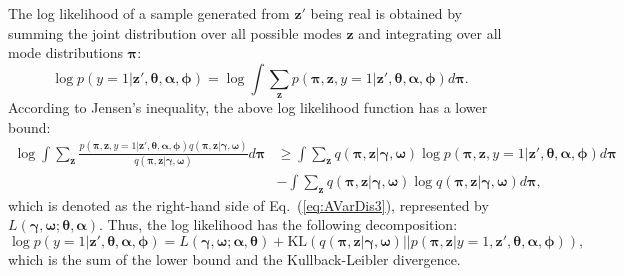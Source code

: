 \documentclass{article}
\begin{document}
The log likelihood of a sample generated from $\mathbf{z}'$ being real is obtained by summing the joint distribution over all possible modes $\mathbf{z}$ and integrating over all mode distributions $\bm{\pi}$:
\begin{equation}
\label{eq:AVarDis2}
\log p\left( y=1 | \mathbf{z}',\bm{\theta},\bm{\alpha}, \bm{\phi} \right)
=
\log
\int
\sum_{\mathbf{z}}
p\left( \bm{\pi},\mathbf{z},y=1 | \mathbf{z}',\bm{\theta},\bm{\alpha},\bm{\phi} \right)
d\bm{\pi}.
\end{equation}
\noindent According to Jensen's inequality, the above log likelihood function has a lower bound:
\begin{align}
\label{eq:AVarDis3}
\log
\int
\sum_{\mathbf{z}}
\frac{p\left( \bm{\pi},\mathbf{z},y=1 | \mathbf{z}',\bm{\theta},\bm{\alpha},\bm{\phi} \right)
q\left( \bm{\pi},\mathbf{z} | \bm{\gamma},\bm{\omega} \right)}
{q\left( \bm{\pi}, \mathbf{z} | \bm{\gamma},\bm{\omega} \right)}
d\bm{\pi}
&\geq  \nonumber
\int
\sum_{\mathbf{z}}
q\left( \bm{\pi}, \mathbf{z}|\bm{\gamma},\bm{\omega} \right)
\log p\left( \bm{\pi},\mathbf{z},y=1 | \mathbf{z}',\bm{\theta},\bm{\alpha},\bm{\phi} \right)
d\bm{\pi}  \\
&-\int
\sum_{\mathbf{z}}
q\left( \bm{\pi},\mathbf{z} | \bm{\gamma},\bm{\omega} \right)
\log q\left( \bm{\pi},\mathbf{z} | \bm{\gamma},\bm{\omega} \right)
d\bm{\pi},
\end{align}
which is denoted as the right-hand side of Eq.~(\ref{eq:AVarDis3}), represented by $L\left(\bm{\gamma},\bm{\omega};\bm{\theta},\bm{\alpha}\right)$.
Thus, the log likelihood has the following decomposition:
\begin{equation}
\label{eq:AVarDis4}
\log p\left(y=1|\mathbf{z}',\bm{\theta},\bm{\alpha}, \bm{\phi}\right)
=
L\left( \bm{\gamma},\bm{\omega};\bm{\alpha},\bm{\theta} \right)
+ \text{KL}\left( q\left( \bm{\pi},\mathbf{z} | \bm{\gamma},\bm{\omega} \right)
|| p\left( \bm{\pi}, \mathbf{z} |y=1, \mathbf{z}',\bm{\theta},\bm{\alpha},\bm{\phi} \right) \right),
\end{equation}
which is the sum of the lower bound and the Kullback-Leibler divergence.
\end{document}
